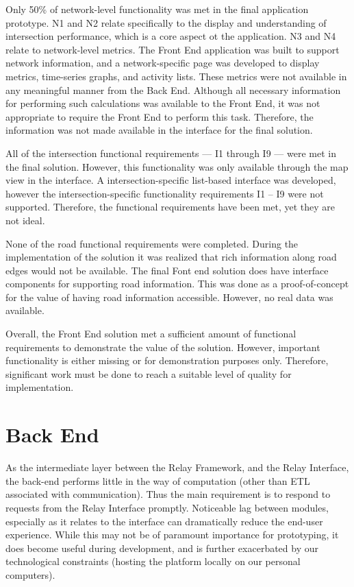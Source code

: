 \documentclass{report}
\begin{document}
Only 50\% of network-level functionality was met in the final application prototype. N1 and N2 relate specifically to the display and understanding of intersection performance, which is a core aspect ot the application. N3 and N4 relate to network-level metrics. The Front End application was built to support network information, and a network-specific page was developed to display metrics, time-series graphs, and activity lists. These metrics were not available in any meaningful manner from the Back End. Although all necessary information for performing such calculations was available to the Front End, it was not appropriate to require the Front End to perform this task. Therefore, the information was not made available in the interface for the final solution.

All of the intersection functional requirements --- I1 through I9 --- were met in the final solution. However, this functionality was only available through the map view in the interface. A intersection-specific list-based interface was developed, however the intersection-specific functionality requirements I1 -- I9 were not supported. Therefore, the functional requirements have been met, yet they are not ideal.

None of the road functional requirements were completed. During the implementation of the solution it was realized that rich information along road edges would not be available. The final Font end solution does have interface components for supporting road information. This was done as a proof-of-concept for the value of having road information accessible. However, no real data was available.

Overall, the Front End solution met a sufficient amount of functional requirements to demonstrate the value of the solution. However, important functionality is either missing or for demonstration purposes only. Therefore, significant work must be done to reach a suitable level of quality for implementation.

\section{Back End}

As the intermediate layer between the Relay Framework, and the Relay Interface, the back-end performs little in the way of computation (other than ETL associated with communication).
Thus the main requirement is to respond to requests from the Relay Interface promptly.
Noticeable lag between modules, especially as it relates to the interface can dramatically reduce the end-user experience.
While this may not be of paramount importance for prototyping, it does become useful during development, and is further exacerbated by our technological constraints (hosting the platform locally on our personal computers).
\end{document}
